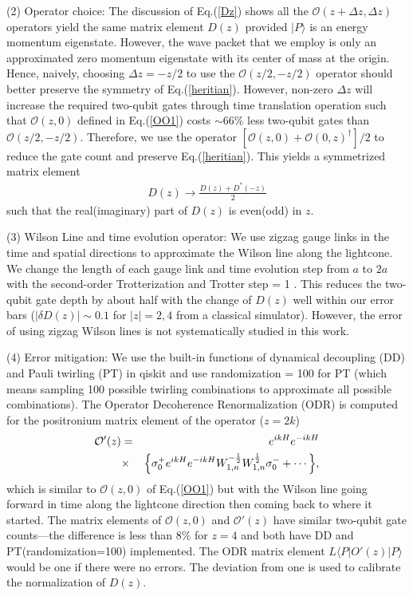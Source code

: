 \documentclass[aps,prd,twocolumn,tightenlines,superscriptaddress,
nofootinbib,preprintnumbers]{revtex4-1}
\begin{document}
 (2) Operator choice: The discussion of 
 Eq.(\ref{Dz}) shows all the
 $\mathcal{O}(z+\Delta z,\Delta z)$ operators yield the same matrix element $D(z)$ provided $|P \rangle$ is an energy momentum eigenstate. However, the wave packet that we employ is only an approximated zero momentum eigenstate with its center of mass at the origin. Hence, naively, choosing $\Delta z=-z/2$
 to use the $\mathcal{O}(z/2,-z/2)$ operator should better preserve the symmetry of Eq.(\ref{heritian}). However, non-zero $\Delta z$ will increase the required two-qubit gates through time translation operation such that $\mathcal{O}(z,0)$ defined in Eq.(\ref{OO1}) costs $\sim 66\%$ less two-qubit gates than $\mathcal{O}(z/2,-z/2)$. 
Therefore, we use the operator $[\mathcal{O}(z,0)+\mathcal{O}(0,z)^{\dagger}]/2$ to reduce the gate count and preserve Eq.(\ref{heritian}). This yields a symmetrized matrix element 
\begin{eqnarray}
\label{tildeD}
    D(z) \to\frac{D(z)+D^*(-z)}{2}
\end{eqnarray}
such that the real(imaginary) part of $D(z)$ is even(odd) in $z$. 

(3) Wilson Line and time evolution operator: We use zigzag gauge links in the time and spatial directions to approximate the Wilson line along the lightcone. We change the length of each gauge link and time evolution step from $a$ to $2a$ with 
the second-order Trotterization and 
Trotter step = 1 \cite{Farrell:2024fit}. This reduces the two-qubit gate depth by about half with the change of $D(z)$ well within our error bars ($|\delta D(z)|\sim 0.1$ for $|z|=2,4$ from a classical simulator). However, the error of using zigzag Wilson lines is not systematically studied in this work.  

(4) Error mitigation: We use the built-in functions of dynamical decoupling (DD) \cite{Viola_1998,Souza_2012,Ezzell:2022uat} and Pauli twirling (PT) \cite{Wallman:2015uzh} in qiskit and use randomization = 100 for PT (which means sampling 100 possible twirling combinations to approximate all possible combinations).
The Operator Decoherence Renormalization (ODR) \cite{ARahman:2022tkr} is computed for the positronium matrix element of the operator ($z=2k$)
\begin{eqnarray}
\label{OO2}
\mathcal{O}'(z)
&=&e^{i k H}e^{-i k H}\nonumber\\
&\times& \Bigl\{\sigma^+_{0} e^{i k H} e^{-i k H} W_{1,n}^{-\frac{1}{2}} W_{1,n}^{\frac{1}{2}} \sigma_{0}^-+\cdots\Bigr\} ,
\end{eqnarray}
which is similar to $\mathcal{O}(z,0)$ of Eq.(\ref{OO1}) 
but with the Wilson line going forward in time along the lightcone direction then coming back to where it started. The matrix elements of $\mathcal{O}(z,0)$ and $\mathcal{O}'(z)$ have similar two-qubit gate counts---the difference is less than 8\% for $z=4$ and both have DD and PT(randomization=100) implemented. The ODR matrix element $L\langle P|{O}'(z)|P \rangle$ would be one if there were no errors. The deviation from one is used to calibrate the normalization of $D(z)$.
\end{document}
